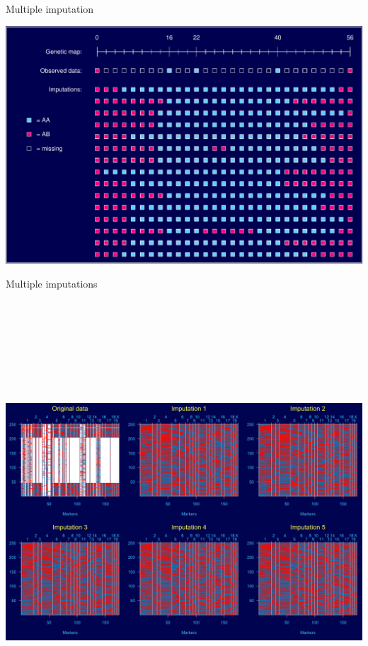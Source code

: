 \documentclass[12pt]{article}
\newcommand{\headsize}{\fontsize{35}{35} \selectfont}
\begin{document}
\newpage

\headsize \color{myyellow}
\hfill \begin{minipage}{5.75in}
\centering
Multiple imputation
\end{minipage}

\vfill

\centerline{\includegraphics{Figs/imp.pdf}}


\newpage

\headsize \color{myyellow}
\hfill \begin{minipage}{5.75in}
\centering
Multiple imputations
\end{minipage}

\vfill

\centerline{\includegraphics[height=6.5in]{Figs/multiimp.png}}
\end{document}
